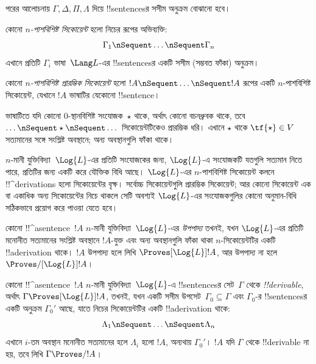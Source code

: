 \documentclass[../../../include/open-logic-section]{subfiles}
\begin{document}


পরের আলোচনায় $\Gamma, \Delta, \Pi, \Lambda$ দিয়ে
!!{sentence}sর সসীম অনুক্রম বোঝানো হবে।

\begin{defn}[সিকোয়েন্ট]
কোনো \emph{$n$-পাশবিশিষ্ট সিকোয়েন্ট} হলো নিচের রূপের অভিব্যক্তি:
\[
\Gamma_1 \nSequent \dots \nSequent \Gamma_n
\]
এখানে প্রতিটি $\Gamma_i$ ভাষা~$\Lang L$-এর !!{sentence}sর
একটি সসীম (সম্ভবত ফাঁকা) অনুক্রম।
\end{defn}

\begin{defn}[প্রারম্ভিক সিকোয়েন্ট]
কোনো \emph{$n$-পাশবিশিষ্ট প্রারম্ভিক সিকোয়েন্ট} হলো
$!A \nSequent \dots \nSequent !A$ রূপের একটি $n$-পাশবিশিষ্ট
সিকোয়েন্ট, যেখানে $!A$ ভাষাটির যেকোনো !!{sentence}।

ভাষাটিতে যদি কোনো $0$-স্থানবিশিষ্ট সংযোজক~$\star$ থাকে,
অর্থাৎ কোনো বচনধ্রুবক থাকে, তবে $\dots \nSequent
\star \nSequent \dots$ সিকোয়েন্টটিকেও প্রারম্ভিক ধরি।
এখানে $\star$ থাকে $\tf{\star} \in V$ সত্যমানের সঙ্গে
সংশ্লিষ্ট অবস্থানে; অন্য অবস্থানগুলি ফাঁকা থাকে।
\end{defn}

$n$-মানী যুক্তিবিদ্যা~$\Log{L}$-এর প্রতিটি সংযোজকের জন্য,
$\Log{L}$-এ সংযোজকটি যতগুলি সত্যমান নিতে পারে, প্রতিটির
জন্য একটি করে যৌক্তিক বিধি আছে। $\Log{L}$-এর $n$-পাশবিশিষ্ট
সিকোয়েন্ট কলনে !!^{derivation}s হলো সিকোয়েন্টের বৃক্ষ।
সর্বোচ্চ সিকোয়েন্টগুলি প্রারম্ভিক সিকোয়েন্ট; আর কোনো সিকোয়েন্ট
এক বা একাধিক অন্য সিকোয়েন্টের নিচে থাকলে সেটি অবশ্যই
$\Log{L}$-এর সংযোজকগুলির কোনো অনুমান-বিধি সঠিকভাবে প্রয়োগ করে
পাওয়া যেতে হবে।

\begin{defn}[উপপাদ্য]
কোনো !!^a{sentence}~$!A$ $n$-মানী যুক্তিবিদ্যা~$\Log{L}$-এর
\emph{উপপাদ্য} তখনই, যখন $\Log{L}$-এর প্রতিটি মনোনীত সত্যমানের
সংশ্লিষ্ট অবস্থানে $!A$-যুক্ত এবং অন্য অবস্থানগুলি ফাঁকা থাকা
$n$-সিকোয়েন্টটির একটি
!!a{derivation} থাকে। $!A$ উপপাদ্য হলে লিখি
$\Proves[\Log{L}] !A$, আর উপপাদ্য না হলে
$\Proves/[\Log{L}] !A$।
\end{defn}

\begin{defn}[!!^{derivability}]
কোনো !!^a{sentence}~$!A$ $n$-মানী যুক্তিবিদ্যা~$\Log{L}$-এ
!!{sentence}sর সেট~$\Gamma$ থেকে \emph{!!{derivable}}, অর্থাৎ
$\Gamma \Proves[\Log{L}] !A$, তখনই, যখন একটি সসীম
উপসেট~$\Gamma_0 \subseteq \Gamma$ এবং $\Gamma_0$-র
!!{sentence}sর একটি অনুক্রম $\Gamma_0'$ আছে, যাতে নিচের
সিকোয়েন্টটির একটি !!a{derivation} থাকে:
\[ \Lambda_1 \nSequent \dots \nSequent \Lambda_n \]
এখানে $i$-তম অবস্থান মনোনীত সত্যমানের হলে $\Lambda_i$ হলো
$!A$, অন্যথায় $\Gamma_0'$। $!A$ যদি $\Gamma$ থেকে
!!{derivable} না হয়, তবে লিখি $\Gamma \Proves/ !A$।
\end{defn}
\end{document}
